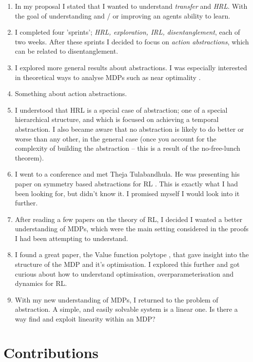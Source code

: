 \begin{enumerate}
  \tightlist
  \item In my proposal I stated that I wanted to understand \textit{transfer} and \textit{HRL}. With the goal of understanding and / or improving an agents ability to learn.
  \item I completed four 'sprints'; \textit{HRL, exploration, IRL, disentanglement}, each of two weeks. After these sprints I decided to focus on \textit{action abstractions},
  which can be related to disentanglement.
  \item I explored more general results about abstractions. I was especially interested in theoretical ways to analyse MDPs such as near optimality \cite{Abel2017}.
  \item Something about action abstractions.
  \item I understood that HRL is a special case of abstraction; one of a special hierarchical structure, and which is focused on achieving a temporal abstraction. I also became aware that no abstraction is likely to do better or worse than any other, in the general case (once you account for the complexity of building the abstraction -- this is a result of the no-free-lunch theorem).
  \item I went to a conference and met Theja Tulabandhula. He was presenting his paper on symmetry based abstractions for RL \cite{Mahajan2017}. This is exactly what I had been looking for, but didn't know it. I promised myself I would look into it further.
  \item After reading a few papers on the theory of RL, I decided I wanted a better understanding of MDPs, which were the main setting considered in the proofs I had been attempting to understand.
  \item I found a great paper, the Value function polytope \cite{Dadashi2018}, that gave insight into the structure of the MDP and it's optimisation. I explored this further and got curious about how to understand optimisation, overparameterisation and dynamics for RL.
  \item With my new understanding of MDPs, I returned to the problem of abstraction. A simple, and easily solvable system is a linear one. Is there a way find and exploit linearity within an MDP?
\end{enumerate}

\section{Contributions}

